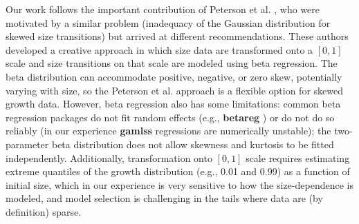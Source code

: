 \documentclass[12pt]{article}
\begin{document}
Our work follows the important contribution of Peterson et al. \citeyear{peterson2019improving}, who were motivated by a similar problem (inadequacy of the Gaussian distribution for skewed size transitions) but arrived at different recommendations. 
These authors developed a creative approach in which size data are transformed onto a $[0,1]$ scale and size transitions on that scale are modeled using beta regression. 
The beta distribution can accommodate positive, negative, or zero skew, potentially varying with size, so the Peterson et al. approach is a 
flexible option for skewed growth data. 
However, beta regression also has some limitations: common beta regression packages do not fit random effects (e.g., \textbf{betareg} \citep{cribari2010beta}) or do not do so reliably (in our experience \textbf{gamlss} regressions are numerically unstable); the two-parameter beta distribution does not allow skewness and kurtosis to be fitted independently. Additionally, transformation onto $[0,1]$ scale requires estimating extreme quantiles
of the growth distribution (e.g., 0.01 and 0.99) as a function of initial size, which in our experience is very sensitive to how the size-dependence is modeled, and model selection is challenging in the tails where data are (by definition) sparse. 
\end{document}
